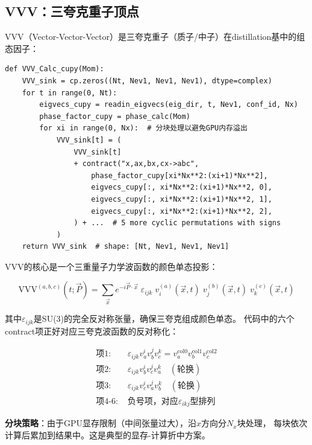 \documentclass[12pt,a4paper]{ctexart}
\begin{document}
\subsection{VVV：三夸克重子顶点}

VVV（Vector-Vector-Vector）是三夸克重子（质子/中子）在distillation基中的组态因子：

\begin{codebox}
\begin{lstlisting}[style=pythonstyle]
def VVV_Calc_cupy(Mom):
    VVV_sink = cp.zeros((Nt, Nev1, Nev1, Nev1), dtype=complex)
    for t in range(0, Nt):
        eigvecs_cupy = readin_eigvecs(eig_dir, t, Nev1, conf_id, Nx)
        phase_factor_cupy = phase_calc(Mom)
        for xi in range(0, Nx):  # 分块处理以避免GPU内存溢出
            VVV_sink[t] = (
                VVV_sink[t]
                + contract("x,ax,bx,cx->abc",
                    phase_factor_cupy[xi*Nx**2:(xi+1)*Nx**2],
                    eigvecs_cupy[:, xi*Nx**2:(xi+1)*Nx**2, 0],
                    eigvecs_cupy[:, xi*Nx**2:(xi+1)*Nx**2, 1],
                    eigvecs_cupy[:, xi*Nx**2:(xi+1)*Nx**2, 2],
                ) + ...  # 5 more cyclic permutations with signs
            )
    return VVV_sink  # shape: [Nt, Nev1, Nev1, Nev1]
\end{lstlisting}
\end{codebox}

\begin{physbox}[VVV的物理构造]

VVV的核心是一个三重量子力学波函数的颜色单态投影：

\begin{equation}
    \text{VVV}^{(a,b,c)}(t; \vec{P}) =
    \sum_{\vec{x}} e^{-i\vec{P}\cdot\vec{x}} \;
    \varepsilon_{ijk} \;
    v^{(a)}_i(\vec{x},t) \;
    v^{(b)}_j(\vec{x},t) \;
    v^{(c)}_k(\vec{x},t)
    \label{eq:VVV}
\end{equation}

其中$\varepsilon_{ijk}$是SU(3)的完全反对称张量，确保三夸克组成颜色单态。
代码中的六个contract项正好对应三夸克波函数的反对称化：

\begin{align}
    \text{项1: } & \varepsilon_{ijk} v_a^i v_b^j v_c^k = v_a^{\text{col0}} v_b^{\text{col1}} v_c^{\text{col2}} \\
    \text{项2: } & \varepsilon_{ijk} v_b^i v_c^j v_a^k \quad (\text{轮换}) \\
    \text{项3: } & \varepsilon_{ijk} v_c^i v_a^j v_b^k \quad (\text{轮换}) \\
    \text{项4-6: } & \text{负号项，对应$\varepsilon_{ikj}$型排列}
\end{align}

\textbf{分块策略}：由于GPU显存限制（中间张量过大），沿$x$方向分$N_x$块处理，
每块依次计算后累加到结果中。这是典型的显存-计算折中方案。
\end{physbox}
\end{document}
